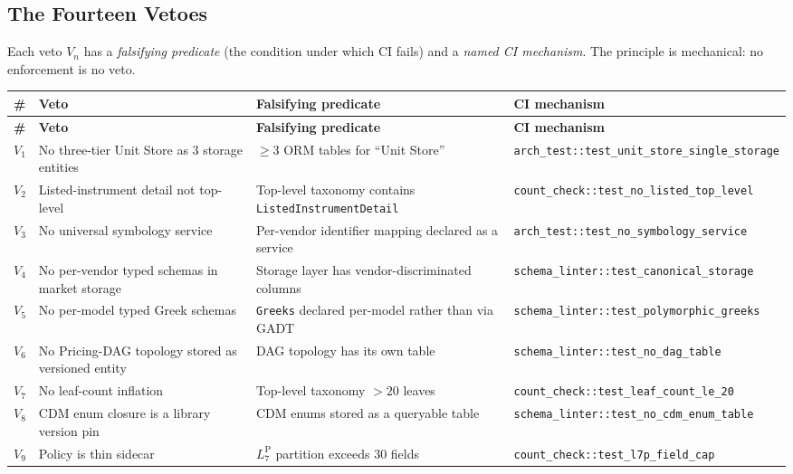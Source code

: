 \documentclass[11pt,a4paper]{article}
\begin{document}
\subsection{The Fourteen Vetoes}
\label{sec:principles-vetoes}

Each veto $V_n$ has a \emph{falsifying predicate} (the condition under which CI fails) and a \emph{named CI mechanism}. The principle is mechanical: no enforcement is no veto.

\begin{center}
\renewcommand{\arraystretch}{1.15}
\begin{longtable}{@{}p{0.8cm}p{4.6cm}p{5.5cm}p{4.5cm}@{}}
\toprule
\textbf{\#} & \textbf{Veto} & \textbf{Falsifying predicate} & \textbf{CI mechanism} \\
\midrule
\endfirsthead
\toprule
\textbf{\#} & \textbf{Veto} & \textbf{Falsifying predicate} & \textbf{CI mechanism} \\
\midrule
\endhead
\bottomrule
\endfoot
$V_1$  & No three-tier Unit Store as 3 storage entities & $\ge 3$ ORM tables for ``Unit Store'' & \texttt{arch\_test::test\_unit\_store\_single\_storage} \\
$V_2$  & Listed-instrument detail not top-level         & Top-level taxonomy contains \texttt{ListedInstrumentDetail} & \texttt{count\_check::test\_no\_listed\_top\_level} \\
$V_3$  & No universal symbology service                  & Per-vendor identifier mapping declared as a service & \texttt{arch\_test::test\_no\_symbology\_service} \\
$V_4$  & No per-vendor typed schemas in market storage   & Storage layer has vendor-discriminated columns & \texttt{schema\_linter::test\_canonical\_storage} \\
$V_5$  & No per-model typed Greek schemas                & \texttt{Greeks} declared per-model rather than via GADT & \texttt{schema\_linter::test\_polymorphic\_greeks} \\
$V_6$  & No Pricing-DAG topology stored as versioned entity & DAG topology has its own table & \texttt{schema\_linter::test\_no\_dag\_table} \\
$V_7$  & No leaf-count inflation                          & Top-level taxonomy $> 20$ leaves & \texttt{count\_check::test\_leaf\_count\_le\_20} \\
$V_8$  & CDM enum closure is a library version pin       & CDM enums stored as a queryable table & \texttt{schema\_linter::test\_no\_cdm\_enum\_table} \\
$V_9$  & Policy is thin sidecar                           & $L_7^{\mathrm{P}}$ partition exceeds 30 fields & \texttt{count\_check::test\_l7p\_field\_cap} \\

\end{longtable}
\end{center}
\end{document}
